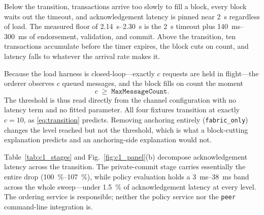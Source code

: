 \documentclass[final,5p,times,twocolumn]{elsarticle}
\begin{document}
Below the transition, transactions arrive too slowly to fill a block, every
block waits out the timeout, and acknowledgement latency is pinned near
\SI{2}{\second} regardless of load. The measured floor of
\SIrange{2.14}{2.30}{\second} is the \SI{2}{\second} timeout plus
\SIrange{140}{300}{\milli\second} of endorsement, validation, and commit. Above
the transition, ten transactions accumulate before the timer expires, the block
cuts on count, and latency falls to whatever the arrival rate makes it.

Because the load harness is closed-loop---exactly $c$ requests are held in
flight---the orderer observes $c$ queued messages, and the block fills on count
the moment
\begin{equation}
c \;\geq\; \texttt{MaxMessageCount}.
\label{eq:transition}
\end{equation}
The threshold is thus read directly from the channel configuration with no
latency term and no fitted parameter. All four fixtures transition at exactly
$c=10$, as \eqref{eq:transition} predicts. Removing anchoring entirely
(\texttt{fabric\_only}) changes the level reached but not the threshold, which
is what a block-cutting explanation predicts and an anchoring-side explanation
would not.

Table~\ref{tab:c1_stages} and Fig.~\ref{fig:c1_panel}(b) decompose
acknowledgement latency across the transition. The private-commit stage carries
essentially the entire drop
(\SIrange{100}{107}{\percent}), while policy evaluation holds a
\SIrange{3}{38}{\milli\second} band across the whole sweep---under
\SI{1.5}{\percent} of acknowledgement latency at every level. The ordering
service is responsible; neither the policy service nor the \texttt{peer}
command-line integration is.

\begin{table}[htbp]\centering
\caption{Acknowledgement latency (ms) across the block-cutting transition,
decomposed by pipeline stage. The private-commit stage accounts for the entire
reduction; policy evaluation is flat.}
\label{tab:c1_stages}
\end{table}
\end{document}
